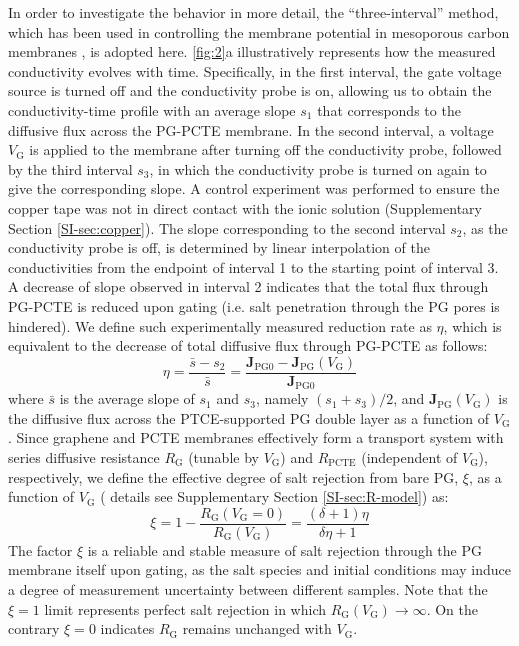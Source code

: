 In order to investigate the behavior in more detail, the ``three-interval'' method, which has been used
in controlling the membrane potential in mesoporous carbon membranes
\cite{Surwade_2014}, is adopted here. \Fig{} \ref{fig:2}a
illustratively represents how the measured conductivity evolves with
time. Specifically, in the first interval, the gate voltage source is
turned off and the conductivity probe is on, allowing us to obtain the
conductivity-time profile with an average slope $s_{1}$ that
corresponds to the diffusive flux across the PG-PCTE membrane. In the
second interval, a voltage $V_{\mathrm{G}}$ is applied to the membrane
after turning off the conductivity probe, followed by the third
interval $s_{3}$, in which the conductivity probe is turned on again
to give the corresponding slope. A control experiment was performed to
ensure the copper tape was not in direct contact with the ionic
solution (Supplementary Section \ref{SI-sec:copper}). The slope
corresponding to the second interval $s_{2}$, as the conductivity
probe is off, is determined by linear interpolation of the
conductivities from the endpoint of interval 1 to the starting point
of interval 3. A decrease of slope observed in interval 2 indicates
that the total flux through PG-PCTE is reduced upon gating (i.e. salt
penetration through the PG pores is hindered). We define such
experimentally measured reduction rate as $\eta$, which is equivalent
to the decrease of total diffusive flux through PG-PCTE as follows:
\begin{equation}
  \label{eq:rejection}
  \eta = \frac{\bar{s} - s_{2}}{\bar{s}} = \frac{\boldsymbol{J}_{\mathrm{PG0}}
    - \boldsymbol{J}_{\mathrm{PG}}(V_{\mathrm{G}})}{\boldsymbol{J}_{\mathrm{PG0}}}
\end{equation}
where $\bar{s}$ is the average slope of $s_{1}$ and $s_{3}$, namely
$(s_{1} + s_{3})/2$, and
$\boldsymbol{J}_{\mathrm{PG}}(V_{\mathrm{G}})$ is the diffusive flux
across the PTCE-supported PG double layer as a function of
$V_{\mathrm{G}}$. Since graphene and PCTE membranes effectively form a
transport system with series diffusive resistance $R_{\mathrm{G}}$
(tunable by $V_{\mathrm{G}}$) and $R_{\mathrm{PCTE}}$ (independent of
$V_{\mathrm{G}}$), respectively, we define the effective degree of
salt rejection from bare PG, $\xi$, as a function of $V_{\mathrm{G}}$ (
details see Supplementary Section \ref{SI-sec:R-model}) as:
\begin{equation}
\label{eq:xi-def}
\xi = 1 - \frac{R_{\mathrm{G}}(V_{\mathrm{G}}=0)}{R_{\mathrm{G}}(V_{\mathrm{G}})} = \frac{(\delta+1) \eta}{\delta \eta + 1}
\end{equation}
The factor $\xi$ is a reliable and stable measure of salt rejection
through the PG membrane itself upon gating, as the salt species and
initial conditions may induce a degree of measurement uncertainty
between different samples. Note that the $\xi=1$ limit represents
perfect salt rejection in which
$R_{\mathrm{G}}(V_{\mathrm{G}}) \to \infty$. On the contrary $\xi=0$
indicates $R_{\mathrm{G}}$ remains unchanged with $V_{\mathrm{G}}$.

